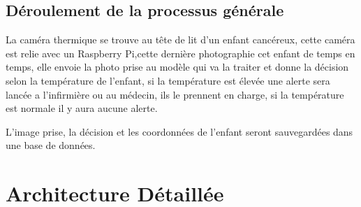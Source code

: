 \documentclass[12pt]{article}
\begin{document}
\subsection{Déroulement de la processus générale}
La caméra thermique se trouve au tête de lit d'un enfant cancéreux, cette caméra est relie avec un Raspberry Pi,cette dernière photographie cet enfant de temps en temps, elle envoie la photo prise au modèle qui va la traiter et donne la décision selon la température de l'enfant, si la température est élevée une alerte sera lancée a l'infirmière ou au médecin, ils le prennent en charge, si la température est normale il y aura aucune alerte.

L'image prise, la décision et les coordonnées de l'enfant seront sauvegardées dans une base de données.
   
\section{Architecture Détaillée}
\end{document}
